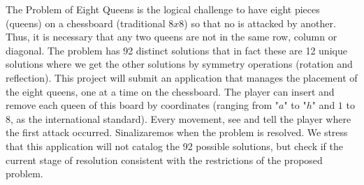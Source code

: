 The Problem of Eight Queens is the logical challenge to have eight pieces (queens) on a chessboard (traditional $8x8 $) so that no is attacked by another. Thus, it is necessary that any two queens are not in the same row, column or diagonal. The problem has 92 distinct solutions that in fact these are 12 unique solutions where we get the other solutions by symmetry operations (rotation and reflection). This project will submit an application that manages the placement of the eight queens, one at a time on the chessboard. The player can insert and remove each queen of this board by coordinates (ranging from "$a$"  to  "$h$" and $1$ to $8$, as the international standard). Every movement, see and tell the player where the first attack occurred. Sinalizaremos when the problem is resolved. We stress that this application will not catalog the 92 possible solutions, but check if the current stage of resolution consistent with the restrictions of the proposed problem.
